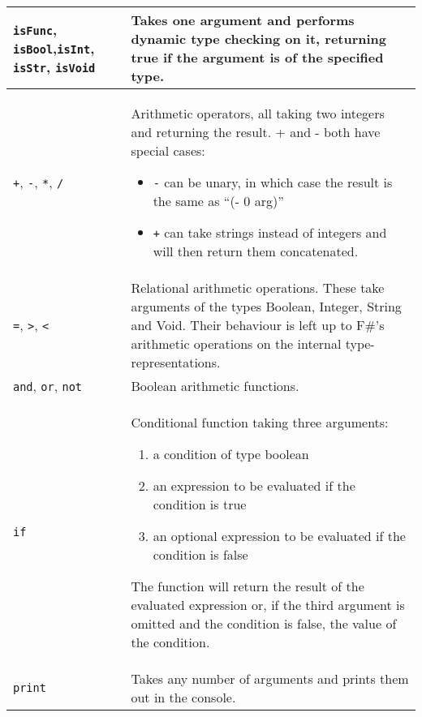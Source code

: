 \documentclass[11pt]{article}
\begin{document}
        \begin{tabularx}{\textwidth} { | >{\raggedright\arraybackslash}p{3cm} | >{\raggedright\arraybackslash}X | }
            \hline
            \lstinline{isFunc}, \lstinline{isBool},\newline \lstinline{isInt}, \lstinline{isStr}, \lstinline{isVoid} &
            Takes one argument and performs dynamic type checking on it, returning true if the argument is of the specified type. \\
            \hline
            \lstinline{+}, \lstinline{-}, \lstinline{*}, \lstinline{/} &
            Arithmetic operators, all taking two integers and returning the result. + and - both have special cases:
            \begin{itemize}
                \item \lstinline{-} can be unary, in which case the result is the same as “(- 0 arg)”
                \item \lstinline{+} can take strings instead of integers and will then return them concatenated.
            \end{itemize} \\
            \hline
            \lstinline{=}, \lstinline{>}, \lstinline{<} &
            Relational arithmetic operations. These take arguments of the types Boolean, Integer, String and Void. Their behaviour is left up
            to F\#’s arithmetic operations on the internal type-representations. \\
            \hline
            \lstinline{and}, \lstinline{or}, \lstinline{not} &
            Boolean arithmetic functions.\\
            \hline
            \lstinline{if} &
            Conditional function taking three arguments:
            \begin{enumerate}
                \item a condition of type boolean
                \item an expression to be evaluated if the condition is true
                \item an optional expression to be evaluated if the condition is false
            \end{enumerate}
            The function will return the result of the evaluated expression or, if the third argument is omitted and the condition is false,
            the value of the condition.\\
            \hline
            \lstinline{print} &
            Takes any number of arguments and prints them out in the console.\\

\end{tabularx}
\end{document}

